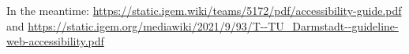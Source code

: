 
In the meantime: \url{https://static.igem.wiki/teams/5172/pdf/accessibility-guide.pdf} and \url{https://static.igem.org/mediawiki/2021/9/93/T--TU_Darmstadt--guideline-web-accessibility.pdf}